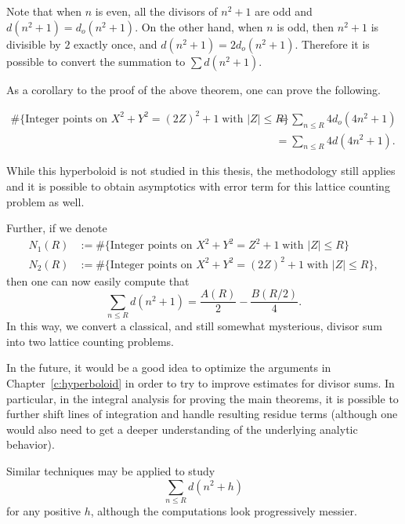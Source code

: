 Note that when $n$ is even, all the divisors of $n^2 + 1$ are odd and $d(n^2 + 1) =
d_o(n^2 + 1)$.
On the other hand, when $n$ is odd, then $n^2 + 1$ is divisible by $2$ exactly once, and
$d(n^2 + 1)=2d_o(n^2 + 1)$.
Therefore it is possible to convert the summation to $\sum d(n^2 + 1)$.



As a corollary to the proof of the above theorem, one can prove the following.
\begin{corollary}
  \begin{align}
    \#\{\text{Integer points on } X^2 + Y^2 = (2Z)^2 + 1 \; \text{with } \lvert Z \rvert
    \leq R \} &= \sum_{n \leq R} 4 d_o(4n^2 + 1) \\
    &= \sum_{n \leq R} 4 d(4n^2 + 1).
  \end{align}
\end{corollary}
While this hyperboloid is not studied in this thesis, the methodology still applies and
it is possible to obtain asymptotics with error term for this lattice counting problem as
well.


Further, if we denote
\begin{align}
  N_1(R) &:= \#\{\text{Integer points on } X^2 + Y^2 = Z^2 + 1 \; \text{with } \lvert Z
  \rvert \leq R \}
  \\
  N_2(R) &:= \#\{\text{Integer points on } X^2 + Y^2 = (2Z)^2 + 1 \; \text{with } \lvert Z
  \rvert \leq R \},
\end{align}
then one can now easily compute that
\begin{equation}
  \sum_{n \leq R} d(n^2 + 1) = \frac{A(R)}{2} - \frac{B(R/2)}{4}.
\end{equation}
In this way, we convert a classical, and still somewhat mysterious, divisor sum into two
lattice counting problems.


In the future, it would be a good idea to optimize the arguments in
Chapter~\ref{c:hyperboloid} in order to try to improve estimates for divisor sums.
In particular, in the integral analysis for proving the main theorems, it is possible to
further shift lines of integration and handle resulting residue terms (although one would
also need to get a deeper understanding of the underlying analytic behavior).



\begin{remark}
  Similar techniques may be applied to study
  \begin{equation}
    \sum_{n \leq R} d(n^2 + h)
  \end{equation}
  for any positive $h$, although the computations look progressively messier.
\end{remark}





